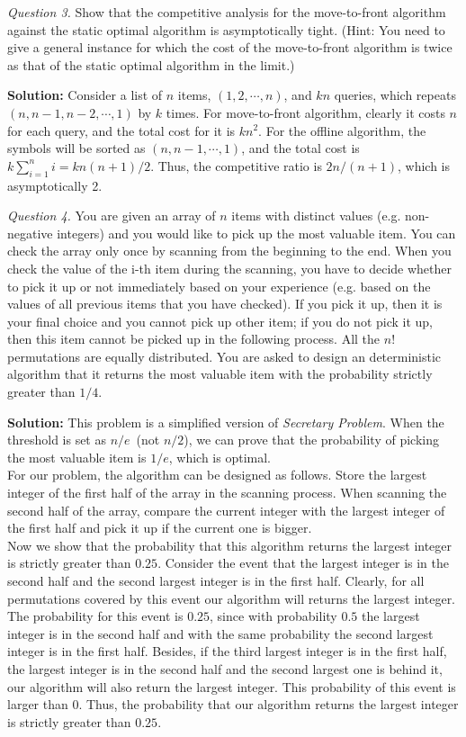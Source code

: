 \documentclass[11pt]{article}
\begin{document}
\medskip\bigskip\rm\noindent
\emph{Question 3.}
Show that the competitive analysis for the move-to-front algorithm against the static optimal algorithm is asymptotically tight.
(Hint: You need to give a general instance for which the cost of the move-to-front algorithm is twice as that of the static optimal algorithm in the limit.)

\noindent
{\bf Solution:}
Consider a list of $n$ items, $(1, 2, \cdots, n)$,
and $kn$ queries, which repeats $(n,n-1,n-2,\cdots,1)$ by $k$ times.
For move-to-front algorithm, clearly it costs $n$ for each query,
and the total cost for it is $kn^2$.
For the offline algorithm,
the symbols will be sorted as $(n, n-1, \cdots, 1)$,
and the total cost is $k \sum_{i=1}^n i = kn(n+1)/2$.
Thus, the competitive ratio is $2n/(n + 1)$, which is asymptotically 2.

\medskip\bigskip\rm\noindent
\emph{Question 4.}
You are given an array of $n$ items with distinct values (e.g.
non-negative integers) and you would like to pick up the
most valuable item. You can check the array only once by scanning from
the beginning to the end. When you
check the value of the i-th item during the scanning, you have to
decide whether to pick it up or not
immediately based on your experience (e.g. based on the values of all
previous items that you have checked).
If you pick it up, then it is your final choice and you cannot pick up
other item;
if you do not pick it up, then this item cannot be picked up in the
following process. All the $n!$
permutations are equally distributed. You are asked to design an
deterministic algorithm that it returns the most valuable item with
the probability strictly greater than $1/4$.

\noindent
{\bf Solution:}
This problem is a simplified version
of \emph{Secretary Problem}.
When the threshold is set as $n/e$~(not $n/2$),
we can prove that the probability of picking the most valuable item is $1/e$, which is optimal.\\
For our problem, the algorithm can be designed as follows.
Store the largest integer of the first half of the array in the scanning process.
When scanning the second half of the array,
compare the current integer with the largest integer of the first half and pick
it up if the current one is bigger.\\
Now we show that the probability that this algorithm returns the largest integer is strictly greater than $0.25$.
Consider the event that the largest integer is in the second half and the second largest integer is in the first half.
Clearly, for all permutations covered by this event our algorithm will returns the largest integer.
The probability for this event is $0.25$, since with probability $0.5$ the largest integer
is in the second half and with the same probability the second largest integer is in the first half.
Besides, if the third largest integer is in the first half,
the largest integer is in the second half and the second largest one is behind it,
our algorithm will also return the largest integer.
This probability of this event is larger than 0.
Thus, the probability that our algorithm returns the largest integer is strictly greater than $0.25$.
\end{document}
